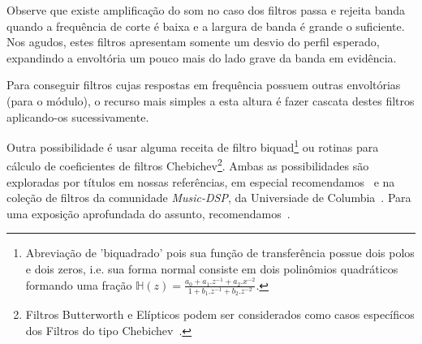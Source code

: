 \begin{itemize}
Observe que existe amplificação do som no caso dos filtros passa e rejeita banda quando a frequência
de corte é baixa e a largura de banda é grande o suficiente. Nos agudos, estes filtros apresentam
somente um desvio do perfil esperado, expandindo a envoltória um pouco mais do lado grave da banda em
evidência.

Para conseguir filtros cujas respostas em frequência possuem outras envoltórias (para o módulo),
o recurso mais simples a esta altura
é fazer cascata destes filtros aplicando-os sucessivamente.

Outra possibilidade é usar alguma receita de filtro
biquad\footnote{Abreviação
de 'biquadrado' pois sua função de transferência possue dois polos e dois zeros, i.e. sua
forma normal consiste em dois polinômios quadráticos formando uma fração
$\mathbb{H}(z)=\frac{a_0+a_1.z^{-1}+a_2.x^{-2}}{1+ b_1.z^{-1} +b_2 . z^{-2}}$.}
ou rotinas para cálculo de coeficientes
de filtros Chebichev\footnote{Filtros Butterworth e Elípticos podem
ser considerados como casos específicos dos Filtros do tipo Chebichev~\cite{Openheim,smith}.}.
Ambas as possibilidades são exploradas
por títulos em nossas referências, em especial recomendamos~\cite{JOSFM,smith} e na coleção de filtros da comunidade \emph{Music-DSP}, da Universiade de Columbia~\cite{music-dsp}.
Para uma exposição aprofundada do assunto, recomendamos~\cite{Openheim}.

\end{itemize}

